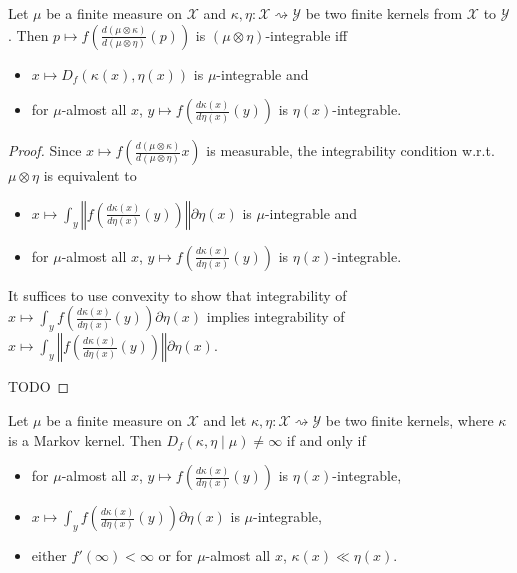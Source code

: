 \begin{lemma}
  \label{lem:integrable_fDiv_compProd_iff}
  \leanok
  Let $\mu$ be a finite measure on $\mathcal X$ and $\kappa, \eta : \mathcal X \rightsquigarrow \mathcal Y$ be two finite kernels from $\mathcal X$ to $\mathcal Y$.
  Then $p \mapsto f \left(\frac{d(\mu \otimes \kappa)}{d(\mu \otimes \eta)}(p)\right)$ is $(\mu \otimes \eta)$-integrable iff
  \begin{itemize}
    \item $x \mapsto D_f(\kappa(x), \eta(x))$ is $\mu$-integrable and
    \item for $\mu$-almost all $x$, $y \mapsto f \left( \frac{d\kappa(x)}{d\eta(x)}(y) \right)$ is $\eta(x)$-integrable. 
  \end{itemize}
\end{lemma}

\begin{proof}
Since $x \mapsto f \left(\frac{d(\mu \otimes \kappa)}{d(\mu \otimes \eta)} x \right)$ is measurable, the integrability condition w.r.t. $\mu \otimes \eta$ is equivalent to
\begin{itemize}
    \item $x \mapsto \int_y \left\Vert f \left( \frac{d\kappa(x)}{d\eta(x)}(y) \right) \right\Vert \partial \eta(x)$ is $\mu$-integrable and
    \item for $\mu$-almost all $x$, $y \mapsto f \left( \frac{d\kappa(x)}{d\eta(x)}(y) \right)$ is $\eta(x)$-integrable. 
  \end{itemize}
It suffices to use convexity to show that integrability of $x \mapsto \int_y f \left( \frac{d\kappa(x)}{d\eta(x)}(y) \right) \partial \eta(x)$ implies integrability of $x \mapsto \int_y \left\Vert f \left( \frac{d\kappa(x)}{d\eta(x)}(y) \right) \right\Vert \partial \eta(x)$.

TODO
\end{proof}

\begin{lemma}
  \label{lem:condFDiv_ne_top_iff}
  \leanok
  Let $\mu$ be a finite measure on $\mathcal X$ and let $\kappa, \eta : \mathcal X \rightsquigarrow \mathcal Y$ be two finite kernels, where $\kappa$ is a Markov kernel.
  Then $D_f(\kappa, \eta \mid \mu) \ne \infty$ if and only if
  \begin{itemize}
    \item for $\mu$-almost all $x$, $y \mapsto f \left( \frac{d\kappa(x)}{d\eta(x)}(y) \right)$ is $\eta(x)$-integrable,
    \item $x \mapsto \int_y f \left( \frac{d\kappa(x)}{d\eta(x)}(y) \right) \partial \eta(x)$ is $\mu$-integrable,
    \item either $f'(\infty) < \infty$ or for $\mu$-almost all $x$, $\kappa(x) \ll \eta(x)$.
  \end{itemize}
\end{lemma}

